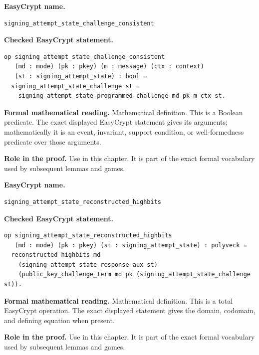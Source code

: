 \begin{formaldefinition}
\noindent\textbf{EasyCrypt name.}
\begin{lstlisting}[language=EasyCrypt,basicstyle=\ttfamily\scriptsize]
signing_attempt_state_challenge_consistent
\end{lstlisting}
\noindent\textbf{Checked EasyCrypt statement.}
\begin{lstlisting}[language=EasyCrypt,basicstyle=\ttfamily\scriptsize]
op signing_attempt_state_challenge_consistent
   (md : mode) (pk : pkey) (m : message) (ctx : context)
   (st : signing_attempt_state) : bool =
  signing_attempt_state_challenge st =
    signing_attempt_state_programmed_challenge md pk m ctx st.
\end{lstlisting}
\noindent\textbf{Formal mathematical reading.}
Mathematical definition. This is a Boolean predicate.  The exact displayed EasyCrypt statement gives its arguments; mathematically it is an event, invariant, support condition, or well-formedness predicate over those arguments.

\noindent\textbf{Role in the proof.}
Use in this chapter. It is part of the exact formal vocabulary used by subsequent lemmas and games.

\end{formaldefinition}

\begin{formaldefinition}
\noindent\textbf{EasyCrypt name.}
\begin{lstlisting}[language=EasyCrypt,basicstyle=\ttfamily\scriptsize]
signing_attempt_state_reconstructed_highbits
\end{lstlisting}
\noindent\textbf{Checked EasyCrypt statement.}
\begin{lstlisting}[language=EasyCrypt,basicstyle=\ttfamily\scriptsize]
op signing_attempt_state_reconstructed_highbits
   (md : mode) (pk : pkey) (st : signing_attempt_state) : polyveck =
  reconstructed_highbits md
    (signing_attempt_state_response_aux st)
    (public_key_challenge_term md pk (signing_attempt_state_challenge st)).
\end{lstlisting}
\noindent\textbf{Formal mathematical reading.}
Mathematical definition. This is a total EasyCrypt operation.  The exact displayed statement gives the domain, codomain, and defining equation when present.

\noindent\textbf{Role in the proof.}
Use in this chapter. It is part of the exact formal vocabulary used by subsequent lemmas and games.

\end{formaldefinition}


